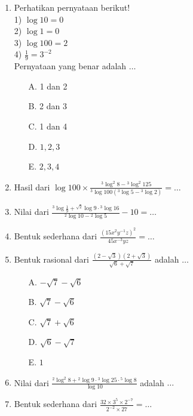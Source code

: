 \documentclass{article}
\begin{document}
\begin{enumerate}
    \item Perhatikan pernyataan berikut!\\
    1) $\log 10 = 0$\\
    2) $\log 1=0$\\
    3) $\log 100 =2$\\
    4) $\frac{1}{9} = 3^{-2}$\\
    Pernyataan yang benar adalah $\dots$
    \begin{multicols}{3}
        \begin{enumerate}
            \item[A.] 1 dan 2
            \item[B.] 2 dan 3
            \item[C.] 1 dan 4
            \item[D.] $1,2,3$
            \item[E.] $2,3,4$
        \end{enumerate}
    \end{multicols}

    \item Hasil dari $\displaystyle \log 100 \times \frac{{}^3 \log^2 8- {}^3 \log^2 125}{{}^3 \log 100 ({}^3 \log 5 - {}^3 \log 2)}=\dots$
    \item Nilai dari $\displaystyle \frac{{}^3 \log \frac{1}{9}+{}^{\sqrt{2}}\log 9 \cdot {}^3 \log 16}{{}^2 \log 10 - {}^2 \log 5}-10=\dots$
    \item Bentuk sederhana dari $\displaystyle \frac{(15x^2 y^{-1}z)^2}{45x^{-3}yz}=\dots$
    \item Bentuk rasional dari $\displaystyle \frac{(2-\sqrt{3})(2+\sqrt{3})}{\sqrt{6}+\sqrt{7}}$ adalah $\dots$
    \begin{multicols}{3}
        \begin{enumerate}
            \item[A.] $-\sqrt{7}-\sqrt{6}$
            \item[B.] $\sqrt{7}-\sqrt{6}$
            \item[C.] $\sqrt{7}+\sqrt{6}$
            \item[D.] $\sqrt{6}-\sqrt{7}$
            \item[E.] $1$
        \end{enumerate}
    \end{multicols}

    \item Nilai dari $\displaystyle \frac{{}^2 \log^2 8+{}^2 \log 9 \cdot{}^3 \log 25 \cdot{}^5 \log 8}{\log 10}$ adalah $\dots$
    \item Bentuk sederhana dari $\displaystyle \frac{32 \times3^5 \times 2^{-7}}{2^{-2} \times 27}=\dots$ 

\end{enumerate}
\end{document}
